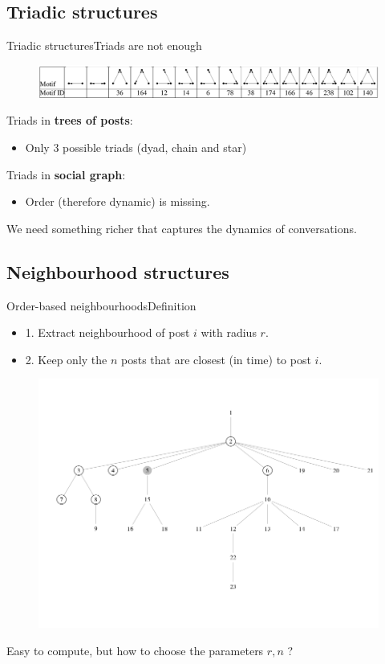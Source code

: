 \documentclass{beamer}
\begin{document}
\subsection{Triadic structures}
\begin{frame}{Triadic structures}{Triads are not enough}
	\begin{figure}
		\centering
		\includegraphics[width=1\textwidth]{triads}
	\end{figure}
	
Triads in \textbf{trees of posts}:
	\begin{itemize}
		\item Only 3 possible triads (dyad, chain and star)
	\end{itemize}

Triads in  \textbf{social graph}:
	\begin{itemize}
		\item Order (therefore dynamic) is missing.
	\end{itemize}
\vfill
We need something richer that captures the dynamics of conversations.
\end{frame}

\subsection{Neighbourhood structures}
\begin{frame}{Order-based neighbourhoods}{Definition}
\begin{itemize}
	\item 1. Extract neighbourhood of post $i$ with radius $r$.
	\item 2. Keep only the $n$ posts that are closest (in time) to post $i$. 
\end{itemize}
	\begin{figure}
		\centering
		\includegraphics[width=01\textwidth]{order_neighbourhood}
	\end{figure}
Easy to compute, but how to choose the parameters $r,n$ ?  	
\end{frame}
\end{document}
